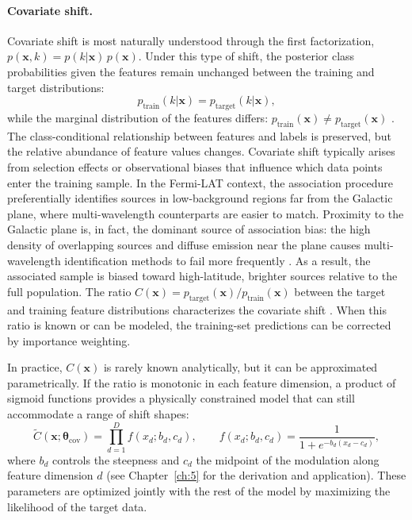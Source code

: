 \paragraph{Covariate shift.}

Covariate shift is most naturally understood through the first factorization, $p(\mathbf{x}, k) = p(k|\mathbf{x})\,p(\mathbf{x})$.
Under this type of shift, the posterior class probabilities given the features remain unchanged between the training and target distributions:
\begin{equation}
	p_{\text{train}}(k|\mathbf{x}) = p_{\text{target}}(k|\mathbf{x}),
	\label{eq:covariate_shift}
\end{equation}
while the marginal distribution of the features differs: $p_{\text{train}}(\mathbf{x}) \neq p_{\text{target}}(\mathbf{x})$ \cite{MorenoTorres2012AUV}.
The class-conditional relationship between features and labels is preserved, but the relative abundance of feature values changes.
Covariate shift typically arises from selection effects or observational biases that influence which data points enter the training sample.
In the Fermi-LAT context, the association procedure preferentially identifies sources in low-background regions far from the Galactic plane, where multi-wavelength counterparts are easier to match.
Proximity to the Galactic plane is, in fact, the dominant source of association bias: the high density of overlapping sources and diffuse emission near the plane causes multi-wavelength identification methods to fail more frequently \cite{2023RASTI...2..735M}.
As a result, the associated sample is biased toward high-latitude, brighter sources relative to the full population.
The ratio $C(\mathbf{x}) = p_{\text{target}}(\mathbf{x})/p_{\text{train}}(\mathbf{x})$ between the target and training feature distributions characterizes the covariate shift \cite{MorenoTorres2012AUV}.
When this ratio is known or can be modeled, the training-set predictions can be corrected by importance weighting.

In practice, $C(\mathbf{x})$ is rarely known analytically, but it can be approximated parametrically.
If the ratio is monotonic in each feature dimension, a product of sigmoid functions provides a physically constrained model that can still accommodate a range of shift shapes:
\begin{equation}
	\tilde{C}(\mathbf{x};\boldsymbol{\theta}_{\text{cov}}) = \prod_{d=1}^{D} f(x_d; b_d, c_d), \qquad f(x_d; b_d, c_d) = \frac{1}{1 + e^{-b_d(x_d - c_d)}},
	\label{eq:sigmoid_modulation}
\end{equation}
where $b_d$ controls the steepness and $c_d$ the midpoint of the modulation along feature dimension $d$ (see Chapter~\ref{ch:5} for the derivation and application).
These parameters are optimized jointly with the rest of the model by maximizing the likelihood of the target data.

